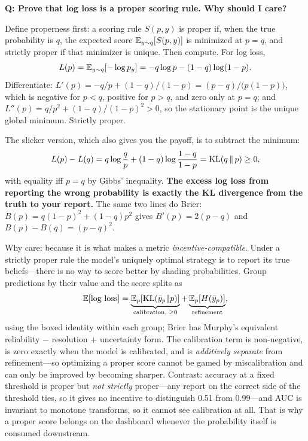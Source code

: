 \begin{interviewq}
\textbf{Q: Prove that log loss is a proper scoring rule. Why should I care?}

 \quad {} \quad \badgefreq{\freqmed}

\stronganswer

Define properness first: a scoring rule $S(p,y)$ is proper if, when the true probability is $q$, the expected score $\operatorname{\mathbb{E}}_{y\sim q}[S(p,y)]$ is minimized at $p = q$, and strictly proper if that minimizer is unique. Then compute. For log loss,
\begin{equation*}
L(p) = \operatorname{\mathbb{E}}_{y\sim q}[-\log p_y] = -q\log p - (1-q)\log(1-p).
\end{equation*}
Differentiate: $L'(p) = -q/p + (1-q)/(1-p) = (p-q)/\big(p(1-p)\big)$, which is negative for $p<q$, positive for $p>q$, and zero only at $p = q$; and $L''(p) = q/p^2 + (1-q)/(1-p)^2 > 0$, so the stationary point is the unique global minimum. Strictly proper.

The slicker version, which also gives you the payoff, is to subtract the minimum:
\begin{equation*}
L(p) - L(q) = q\log\frac{q}{p} + (1-q)\log\frac{1-q}{1-p} = \operatorname{KL}(q\,\|\,p) \ge 0,
\end{equation*}
with equality iff $p = q$ by Gibbs' inequality. \textbf{The excess log loss from reporting the wrong probability is exactly the KL divergence from the truth to your report.} The same two lines do Brier: $B(p) = q(1-p)^2 + (1-q)p^2$ gives $B'(p) = 2(p-q)$ and $B(p) - B(q) = (p-q)^2$.

Why care: because it is what makes a metric \textit{incentive-compatible}. Under a strictly proper rule the model's uniquely optimal strategy is to report its true beliefs---there is no way to score better by shading probabilities. Group predictions by their value and the score splits as
\begin{equation*}
\operatorname{\mathbb{E}}[\text{log loss}] = \underbrace{\operatorname{\mathbb{E}}_p[\operatorname{KL}(\bar y_p \| p)]}_{\text{calibration, }\ge 0} + \underbrace{\operatorname{\mathbb{E}}_p[H(\bar y_p)]}_{\text{refinement}},
\end{equation*}
using the boxed identity within each group; Brier has Murphy's equivalent reliability $-$ resolution $+$ uncertainty form. The calibration term is non-negative, is zero exactly when the model is calibrated, and is \textit{additively separate} from refinement---so optimizing a proper score cannot be gamed by miscalibration and can only be improved by becoming sharper. Contrast: accuracy at a fixed threshold is proper but \textit{not strictly} proper---any report on the correct side of the threshold ties, so it gives no incentive to distinguish 0.51 from 0.99---and AUC is invariant to monotone transforms, so it cannot see calibration at all. That is why a proper score belongs on the dashboard whenever the probability itself is consumed downstream.


\end{interviewq}
